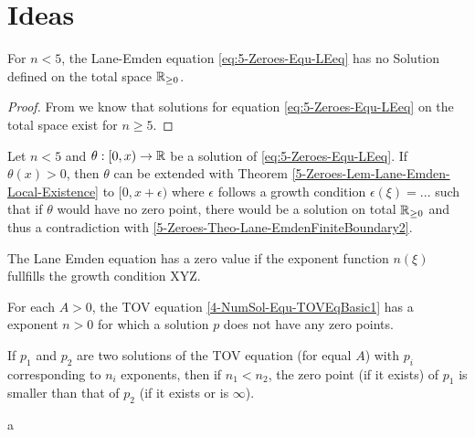 \section{Ideas}

%
%
%
\begin{theorem}
	\label{5-Zeroes-Theo-Lane-EmdenFiniteBoundary2}
	For $n<5$, the Lane-Emden equation \ref{eq:5-Zeroes-Equ-LEeq} has no Solution defined on the total space $\mathbb{R}_{\geq0}$.
\end{theorem}
\begin{proof}
	From \cite{quittnerSuperlinearParabolicProblems2007} we know that solutions for equation \ref{eq:5-Zeroes-Equ-LEeq} on the total space exist for $n\geq5$.
	
\end{proof}
%
%
%
\begin{theorem}
	\label{5-Zeroes-Theo-Lane-EmdenFiniteBoundary3}
	Let $n<5$ and $\theta:[0,x)\rightarrow\mathbb{R}$ be a solution of \ref{eq:5-Zeroes-Equ-LEeq}. If $\theta(x)>0$, then $\theta$ can be extended with Theorem \ref{5-Zeroes-Lem-Lane-Emden-Local-Existence}
	to $[0,x+\epsilon)$ where $\epsilon$ follows a growth condition $\epsilon(\xi)=...$ such that if $\theta$ would have no zero point, there would be a solution on total 
	$\mathbb{R}_{\geq0}$ and thus a contradiction with \ref{5-Zeroes-Theo-Lane-EmdenFiniteBoundary2}.
\end{theorem}
\begin{theorem}
	The Lane Emden equation has a zero value if the exponent function $n(\xi)$ fullfills the growth condition XYZ.
\end{theorem}


\begin{theorem}
	For each $A>0$, the TOV equation \ref{4-NumSol-Equ-TOVEqBasic1} has a exponent $n>0$ for which a solution $p$ does not have any zero points.
\end{theorem}
\begin{theorem}
	If $p_1$ and $p_2$ are two solutions of the TOV equation (for equal $A$) with $p_i$ corresponding to $n_i$ exponents, then if $n_1<n_2$, the zero 
	point (if it exists) of $p_1$ is smaller than that of $p_2$ (if it exists or is $\infty$).
\end{theorem}
\begin{theorem}
	a 
\end{theorem}




